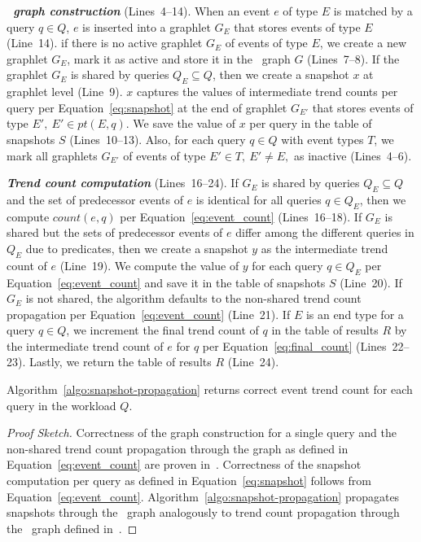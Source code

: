 \textbf{\textit{\app\ graph construction}} (Lines~4--14).
When an event $e$ of type $E$ is matched by a query $q \in Q$, $e$ is inserted into a graphlet $G_E$ that stores events of type $E$ (Line~14). 
%
if there is no active graphlet $G_E$ of events of type $E$, we create a new graphlet $G_E$, mark it as active and store it in the \app\ graph $G$ (Lines~7--8). If the graphlet $G_E$ is shared by queries $Q_E \subseteq Q$, then we create a snapshot $x$ at graphlet level (Line~9). $x$ captures the values of intermediate trend counts per query per Equation~\ref{eq:snapshot} at the end of graphlet $G_{E'}$ that stores events of type $E',\ E' \in pt(E,q)$. We save the value of $x$ per query in the table of snapshots $S$ (Lines~10--13).
%
Also, for each query $q \in Q$ with event types $T$, we mark all graphlets $G_{E'}$ of events of type $E' \in T,\ E' \neq E,$ as inactive (Lines~4--6). 

\textbf{\textit{Trend count computation}} (Lines~16--24).
If $G_E$ is shared by queries $Q_E \subseteq Q$ and the set of predecessor events of $e$ is identical for all queries $q \in Q_E$, then we compute $count(e,q)$ per Equation~\ref{eq:event_count} (Lines~16--18).
%
If $G_E$ is shared but the sets of predecessor events of $e$ differ among the different queries in $Q_E$ due to predicates, then we create a snapshot $y$ as the intermediate trend count of $e$ (Line~19). 
We compute the value of $y$ for each query $q \in Q_E$ per Equation~\ref{eq:event_count} and save it in the table of snapshots $S$ (Line~20).
%
If $G_E$ is not shared, the algorithm defaults to the non-shared trend count propagation per Equation~\ref{eq:event_count} (Line~21).
%
If $E$ is an end type for a query $q \in Q$, we increment the final trend count of $q$ in the table of results $R$ by the intermediate trend count of $e$ for $q$ per Equation~\ref{eq:final_count} (Lines~22--23).
%
Lastly, we return the table of results $R$ (Line~24).

\begin{theorem}
Algorithm~\ref{algo:snapshot-propagation} returns correct event trend count for each query in the workload $Q$. 
\end{theorem}

\begin{proof}[Proof Sketch]
%
Correctness of the graph construction for a single query and the non-shared trend count propagation through the graph as defined in Equation~\ref{eq:event_count} are proven in~\cite{PLRM18}. 
Correctness of the snapshot computation per query as defined in Equation~\ref{eq:snapshot} follows from Equation~\ref{eq:event_count}. 
Algorithm~\ref{algo:snapshot-propagation} propagates snapshots through the \app\ graph analogously to trend count propagation through the \greta\ graph defined in~\cite{PLRM18}.
%
\end{proof}

